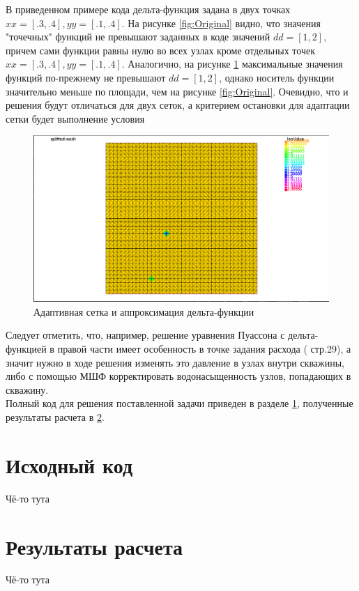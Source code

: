 В приведенном примере кода дельта-функция задана в двух точках $xx = [.3, .4], yy = [.1, .4]$.
На рисунке \ref{fig:Original} видно, что значения "точечных" функций не превышают
заданных в коде значений $dd = [1, 2]$, причем сами функции равны нулю во всех узлах кроме
отдельных точек $xx = [.3, .4], yy = [.1, .4]$.
Аналогично, на рисунке \ref{fig:Split} максимальные значения функций по-прежнему не превышают
$dd = [1, 2]$, однако носитель функции значительно меньше по площади, чем на рисунке \ref{fig:Original}.
Очевидно, что и решения будут отличаться для двух сеток, а критерием остановки для адаптации сетки будет 
выполнение условия  
\begin{figure}[H]
	\centering
	\includegraphics[width=0.7\linewidth]{img/splitMesh.png}
	\caption{Адаптивная сетка и аппроксимация дельта-функции}
	\label{fig:Split}
\end{figure}
Следует отметить, что, например, решение уравнения Пуассона с дельта-функцией в правой части имеет 
особенность в точке задания расхода (\cite{Hunt} стр.29), а значит нужно в ходе решения изменять это 
давление в узлах внутри скважины, либо с помощью МШФ корректировать водонасыщенность узлов, попадающих 
в скважину.\\
Полный код для решения поставленной задачи приведен в разделе \ref{appendix:App1}, полученные результаты расчета в 
\ref{appendix:App2}.

\newpage


\section{Исходный код}\label{appendix:App1}
	Чё-то тута
\newpage
\section{Результаты расчета}\label{appendix:App2}
	Чё-то тута
\newpage



